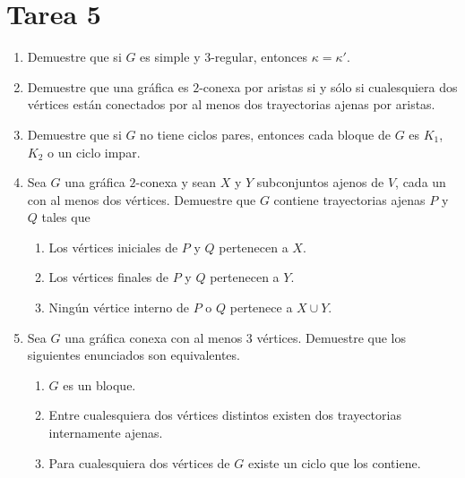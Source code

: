 \documentclass{article}
\begin{document}
\section*{\LARGE{Tarea 5}}
\begin{enumerate}
\item Demuestre que si $G$ es simple y $3$-regular, entonces $\kappa =
  \kappa'$.
\item Demuestre que una gr\'afica es $2$-conexa por aristas si y s\'olo si
  cualesquiera dos v\'ertices est\'an conectados por al menos dos trayectorias
  ajenas por aristas.
\item Demuestre que si $G$ no tiene ciclos pares, entonces cada bloque de $G$
  es $K_1$, $K_2$ o un ciclo impar.
\item Sea $G$ una gr\'afica $2$-conexa y sean $X$ y $Y$ subconjuntos ajenos de
  $V$, cada un con al menos dos v\'ertices.   Demuestre que $G$ contiene
  trayectorias ajenas $P$ y $Q$ tales que
  \begin{enumerate}
  \item Los v\'ertices iniciales de $P$ y $Q$ pertenecen a $X$.

  \item Los v\'ertices finales de $P$ y $Q$ pertenecen a $Y$.

  \item Ning\'un v\'ertice interno de $P$ o $Q$ pertenece a $X \cup Y$.
  \end{enumerate}
\item Sea $G$ una gr\'afica conexa con al menos 3 v\'ertices. Demuestre que
  los siguientes enunciados son equivalentes.
  \begin{enumerate}
  \item $G$ es un bloque.

  \item Entre cualesquiera dos v\'ertices distintos existen dos trayectorias
    internamente ajenas.

  \item Para cualesquiera dos v\'ertices de $G$ existe un ciclo que los
    contiene.


\end{enumerate}
\end{enumerate}
\end{document}
